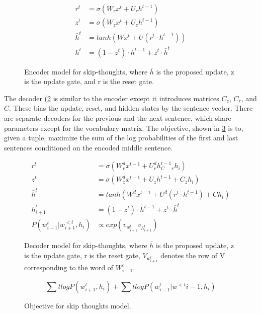 \begin{figure}
    \centering
    \begin{align*}
    r^t &= \sigma(W_rx^t + U_r h^{t-1}) \\
    z^t &= \sigma (W_z x^t + U_z h^{t-1}) \\
    \bar h^t &= tanh(Wx^t + U(r^t \cdot h^{t-1})) \\
    h^t &= (1 - z^t) \cdot h^{t-1} + z^t \cdot \bar h ^t
    \end{align*}
    \caption{Encoder model for skip-thoughts, where $\bar h$ is the proposed update, z is the update gate, and r is the reset gate.}
    \label{fig:skipthoughts-encoder}
\end{figure}

The decoder (\ref{fig:skipthoughts-decoder} is similar to the encoder except it introduces matrices $C_z$, $C_r$, and $C$. These bias the update, reset, and hidden states by the sentence vector. There are separate decoders for the previous and the next sentence, which share parameters except for the vocabulary matrix. The objective, shown in \ref{fig:skipthoughts-obj} is to, given a tuple, maximize the sum of the log probabilities of the first and last sentences conditioned on the encoded middle sentence. 

\begin{figure}
    \centering
    \begin{align*}
    r^t &= \sigma(W_r^d x^{t-1} + U_r^d h^{t-1} _  C_r h_i) \\
    z^t &= \sigma (W_z^d x^{t-1} + U_z h^{t-1} + C_z h_i) \\
    \bar h^t &= tanh(W^d x^{t-1} + U^d(r^t \cdot h^{t-1}) + C h_i) \\
    h^t_{i+1} &= (1 - z^t) \cdot h^{t-1} + z^t \cdot \bar h ^t \\
    P(w^t_{i+1}|w^{<t}_{i+1}, h_i) &\propto exp(v_{w^t_{i+1}}v_{h^t_{i+1}})
    \end{align*}
    \caption{Decoder model for skip-thoughts, where $\bar h$ is the proposed update, z is the update gate, r is the reset gate, $V_{w^t_{i+1}}$ denotes the row of V corresponding to the word of $W^t_{i+1}$.}
    \label{fig:skipthoughts-decoder}
\end{figure}

\begin{figure}
    \centering
    $$
    \sum\limits{t}logP(w^t_{i+1}, h_i) + \sum\limits{t}log P (w^t_{i-1}|w^{<t}{i-1}, h_i)
    $$
    \caption{Objective for skip thoughts model.}
    \label{fig:skipthoughts-obj}
\end{figure}

